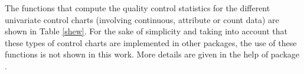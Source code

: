 The functions that compute the quality control statistics for the different univariate control charts (involving continuous, attribute or count data) are shown in Table \ref{shew}. For the sake of simplicity and taking into account that these types of control charts are implemented in other packages, the use of these functions is not shown in this work. More details are given in the help of  package \citep{flores2016qualityreview}.

%

